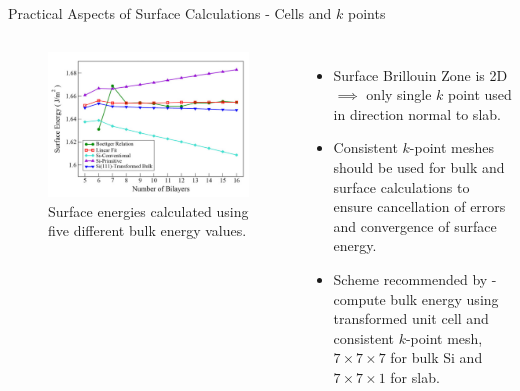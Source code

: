 \documentclass[aspectratio=169]{beamer}
\begin{document}
    \begin{frame}{Practical Aspects of Surface Calculations - Cells and $k$ points}
        \begin{columns}
            \begin{figure}
                \centering
                \includegraphics[width=\linewidth]{lectures/figures/11_surface_kpoints.png}
                \caption{Surface energies calculated using five different bulk energy values.\cite{sunEfficientCreationConvergence2013}}
            \end{figure}
            \begin{itemize}
                \item Surface Brillouin Zone is 2D $\implies$ only single $k$ point used in direction normal to slab.
                \item Consistent $k$-point meshes should be used for bulk and surface calculations to ensure cancellation of errors and convergence of surface energy.
                \item Scheme recommended by \cite{sunEfficientCreationConvergence2013} - compute bulk energy using transformed unit cell and consistent $k$-point mesh, $7 \times 7 \times 7$ for bulk Si and $7 \times 7 \times 1$ for slab.
            \end{itemize}
        \end{columns}

    \end{frame}
\end{document}
